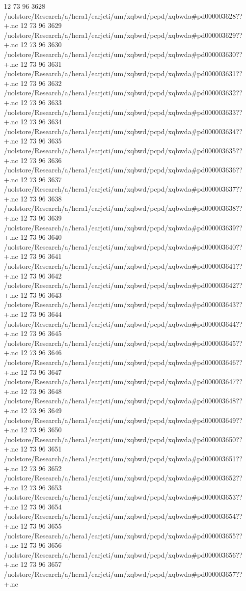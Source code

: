 12 73 96
3628
/uolstore/Research/a/hera1/earjcti/um/xqbwd/pcpd/xqbwda#pd000003628??+.nc
12 73 96
3629
/uolstore/Research/a/hera1/earjcti/um/xqbwd/pcpd/xqbwda#pd000003629??+.nc
12 73 96
3630
/uolstore/Research/a/hera1/earjcti/um/xqbwd/pcpd/xqbwda#pd000003630??+.nc
12 73 96
3631
/uolstore/Research/a/hera1/earjcti/um/xqbwd/pcpd/xqbwda#pd000003631??+.nc
12 73 96
3632
/uolstore/Research/a/hera1/earjcti/um/xqbwd/pcpd/xqbwda#pd000003632??+.nc
12 73 96
3633
/uolstore/Research/a/hera1/earjcti/um/xqbwd/pcpd/xqbwda#pd000003633??+.nc
12 73 96
3634
/uolstore/Research/a/hera1/earjcti/um/xqbwd/pcpd/xqbwda#pd000003634??+.nc
12 73 96
3635
/uolstore/Research/a/hera1/earjcti/um/xqbwd/pcpd/xqbwda#pd000003635??+.nc
12 73 96
3636
/uolstore/Research/a/hera1/earjcti/um/xqbwd/pcpd/xqbwda#pd000003636??+.nc
12 73 96
3637
/uolstore/Research/a/hera1/earjcti/um/xqbwd/pcpd/xqbwda#pd000003637??+.nc
12 73 96
3638
/uolstore/Research/a/hera1/earjcti/um/xqbwd/pcpd/xqbwda#pd000003638??+.nc
12 73 96
3639
/uolstore/Research/a/hera1/earjcti/um/xqbwd/pcpd/xqbwda#pd000003639??+.nc
12 73 96
3640
/uolstore/Research/a/hera1/earjcti/um/xqbwd/pcpd/xqbwda#pd000003640??+.nc
12 73 96
3641
/uolstore/Research/a/hera1/earjcti/um/xqbwd/pcpd/xqbwda#pd000003641??+.nc
12 73 96
3642
/uolstore/Research/a/hera1/earjcti/um/xqbwd/pcpd/xqbwda#pd000003642??+.nc
12 73 96
3643
/uolstore/Research/a/hera1/earjcti/um/xqbwd/pcpd/xqbwda#pd000003643??+.nc
12 73 96
3644
/uolstore/Research/a/hera1/earjcti/um/xqbwd/pcpd/xqbwda#pd000003644??+.nc
12 73 96
3645
/uolstore/Research/a/hera1/earjcti/um/xqbwd/pcpd/xqbwda#pd000003645??+.nc
12 73 96
3646
/uolstore/Research/a/hera1/earjcti/um/xqbwd/pcpd/xqbwda#pd000003646??+.nc
12 73 96
3647
/uolstore/Research/a/hera1/earjcti/um/xqbwd/pcpd/xqbwda#pd000003647??+.nc
12 73 96
3648
/uolstore/Research/a/hera1/earjcti/um/xqbwd/pcpd/xqbwda#pd000003648??+.nc
12 73 96
3649
/uolstore/Research/a/hera1/earjcti/um/xqbwd/pcpd/xqbwda#pd000003649??+.nc
12 73 96
3650
/uolstore/Research/a/hera1/earjcti/um/xqbwd/pcpd/xqbwda#pd000003650??+.nc
12 73 96
3651
/uolstore/Research/a/hera1/earjcti/um/xqbwd/pcpd/xqbwda#pd000003651??+.nc
12 73 96
3652
/uolstore/Research/a/hera1/earjcti/um/xqbwd/pcpd/xqbwda#pd000003652??+.nc
12 73 96
3653
/uolstore/Research/a/hera1/earjcti/um/xqbwd/pcpd/xqbwda#pd000003653??+.nc
12 73 96
3654
/uolstore/Research/a/hera1/earjcti/um/xqbwd/pcpd/xqbwda#pd000003654??+.nc
12 73 96
3655
/uolstore/Research/a/hera1/earjcti/um/xqbwd/pcpd/xqbwda#pd000003655??+.nc
12 73 96
3656
/uolstore/Research/a/hera1/earjcti/um/xqbwd/pcpd/xqbwda#pd000003656??+.nc
12 73 96
3657
/uolstore/Research/a/hera1/earjcti/um/xqbwd/pcpd/xqbwda#pd000003657??+.nc
